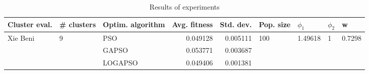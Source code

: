 \begin{table}
\centering
\caption{Results of experiments}
\begin{tabular}{lllrrllll}
\toprule
            Cluster eval. &        \# clusters & Optim. algorithm &  Avg. fitness &  Std. dev. &            Pop. size &               $\phi_{1}$ &         $\phi_{2}$ &                       w \\
\midrule
\multirow{3}{*}{Xie Beni} & \multirow{3}{*}{9} &              PSO &      0.049128 &   0.005111 & \multirow{3}{*}{100} & \multirow{3}{*}{1.49618} & \multirow{3}{*}{1} & \multirow{3}{*}{0.7298} \\
                          &                    &            GAPSO &      0.053771 &   0.003687 &                      &                          &                    &                         \\
                          &                    &          LOGAPSO &      0.049406 &   0.001381 &                      &                          &                    &                         \\
\bottomrule
\end{tabular}
\end{table}
